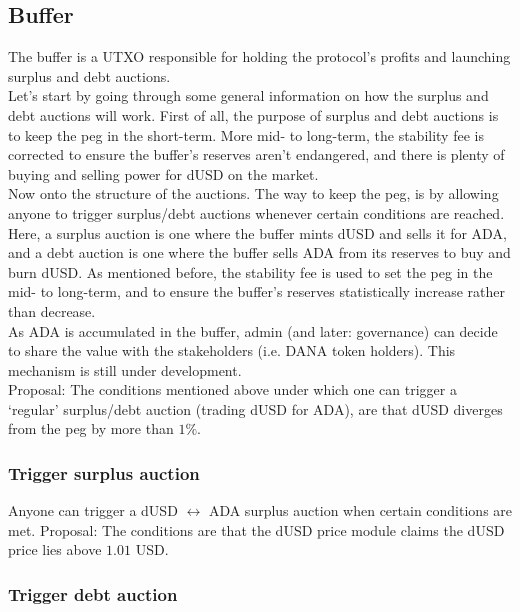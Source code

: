 \documentclass{article} %
\begin{document}
\subsection{Buffer}

The buffer is a UTXO responsible for holding the protocol's profits and launching
surplus and debt auctions. \\

Let's start by going through some general information on how the surplus and
debt auctions will work.
First of all, the purpose of surplus and debt auctions is to keep the peg in the
short-term.
More mid- to long-term, the stability fee is corrected to ensure the buffer's
reserves aren't endangered, and there is plenty of buying and selling power for
dUSD on the market. \\

Now onto the structure of the auctions.
The way to keep the peg, is by allowing anyone to trigger surplus/debt auctions
whenever certain conditions are reached.
Here, a surplus auction is one where the buffer mints dUSD and sells it for ADA,
and a debt auction is one where the buffer sells ADA from its reserves to buy
and burn dUSD.
As mentioned before, the stability fee is used to set the peg in the mid- to
long-term, and to ensure the buffer's reserves statistically increase rather
than decrease. \\

As ADA is accumulated in the buffer, admin (and later: governance) can decide to
share the value with the stakeholders (i.e. DANA token holders).
This mechanism is still under development. \\

Proposal: The conditions mentioned above under which one can trigger a `regular'
surplus/debt auction (trading dUSD for ADA), are that dUSD diverges from the peg
by more than $1\%$.

\subsubsection{Trigger surplus auction}

Anyone can trigger a dUSD $\leftrightarrow$ ADA surplus auction when certain
conditions are met.
Proposal: The conditions are that the dUSD price module claims the dUSD price
lies above $1.01$ USD.

\subsubsection{Trigger debt auction}
\end{document}
